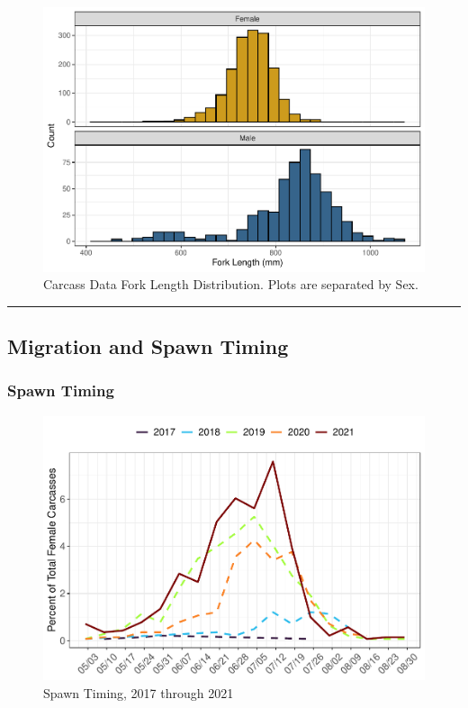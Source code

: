 \documentclass[
]{book}
\theoremstyle{definition}
\theoremstyle{definition}
\theoremstyle{definition}
\theoremstyle{definition}
\theoremstyle{remark}
\begin{document}
\begin{figure}
\centering
\includegraphics{_main_files/figure-latex/carcassFL-fig-1.pdf}
\caption{\label{fig:carcassFL-fig}Carcass Data Fork Length Distribution. Plots are separated by Sex.}
\end{figure}

\begin{center}\rule{0.5\linewidth}{0.5pt}\end{center}

\hypertarget{migration-and-spawn-timing}{%
\subsection{Migration and Spawn Timing}\label{migration-and-spawn-timing}}

\hypertarget{spawn-timing}{%
\subsubsection{Spawn Timing}\label{spawn-timing}}

\begin{figure}
\centering
\includegraphics{_main_files/figure-latex/spawntiming-fig-1.pdf}
\caption{\label{fig:spawntiming-fig}Spawn Timing, 2017 through 2021}
\end{figure}
\end{document}
